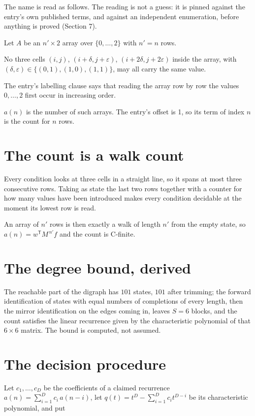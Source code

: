 \documentclass[11pt]{article}
\theoremstyle{definition}
\begin{document}
The name is read as follows. The reading is not a guess: it is pinned against the entry's own published terms, and against an independent enumeration, before anything is proved (Section 7).

Let $A$ be an $n' \times 2$ array over $\{0,\dots,2\}$ with $n' = n$ rows.

No three cells $(i,j)$, $(i{+}\delta,j{+}\varepsilon)$, $(i{+}2\delta,j{+}2\varepsilon)$ inside the array, with $(\delta,\varepsilon) \in \{(0,1), (1,0), (1,1)\}$, may all carry the same value.

The entry's labelling clause says that reading the array row by row the values $0,\dots,2$ first occur in increasing order.

$a(n)$ is the number of such arrays. The entry's offset is 1, so its term of index $n$ is the count for $n$ rows.

\section{The count is a walk count}

Every condition looks at three cells in a straight line, so it spans at most three consecutive rows. Taking as state the last two rows together with a counter for how many values have been introduced makes every condition decidable at the moment its lowest row is read.

An array of $n'$ rows is then exactly a walk of length $n'$ from the empty state, so $a(n) = w^{\mathsf T}M^{\,n'}f$ and the count is C-finite.

\section{The degree bound, derived}

The reachable part of the digraph has $101$ states, $101$ after trimming; the forward identification of states with equal numbers of completions of every length, then the mirror identification on the edges coming in, leaves $S = 6$ blocks, and the count satisfies the linear recurrence given by the characteristic polynomial of that $6\times6$ matrix. The bound is computed, not assumed.

\section{The decision procedure}

Let $c_1,\dots,c_D$ be the coefficients of a claimed recurrence $a(n) = \sum_{i=1}^{D} c_i\,a(n-i)$, let $q(t) = t^{D} - \sum_{i=1}^{D} c_i t^{D-i}$ be its characteristic polynomial, and put
\end{document}
